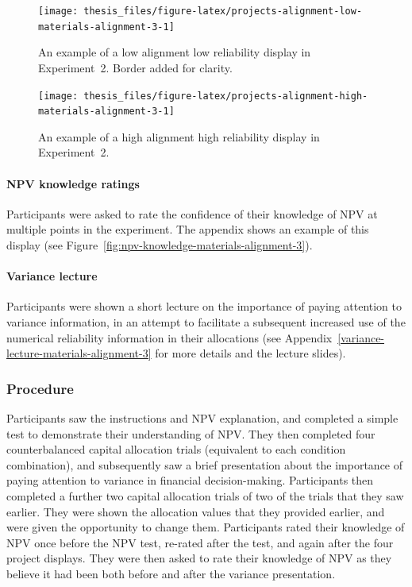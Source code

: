 \documentclass[a4paper, nobind, dvipsnames]{templates/ociamthesis}
\theoremstyle{definition}
\theoremstyle{definition}
\theoremstyle{definition}
\theoremstyle{definition}
\theoremstyle{remark}
\begin{document}
\begin{figure}
\texttt{[image: thesis\_files/figure-latex/projects-alignment-low-materials-alignment-3-1]} \caption{An example of a low alignment low reliability display in Experiment~2. Border added for clarity.}\label{fig:projects-alignment-low-materials-alignment-3}
\end{figure}



\begin{figure}
\texttt{[image: thesis\_files/figure-latex/projects-alignment-high-materials-alignment-3-1]} \caption{An example of a high alignment high reliability display in Experiment~2.}\label{fig:projects-alignment-high-materials-alignment-3}
\end{figure}

\paragraph{NPV knowledge ratings}

Participants were asked to rate the confidence of their knowledge of NPV at
multiple points in the experiment. The appendix shows an example of this display
(see Figure~\ref{fig:npv-knowledge-materials-alignment-3}).

\paragraph{Variance lecture}

Participants were shown a short lecture on the importance of paying attention to
variance information, in an attempt to facilitate a subsequent increased use of
the numerical reliability information in their allocations (see
Appendix~\ref{variance-lecture-materials-alignment-3} for more details and the
lecture slides).

\hypertarget{procedure-alignment-3}{%
\subsubsection{Procedure}\label{procedure-alignment-3}}

Participants saw the instructions and NPV explanation, and completed a simple
test to demonstrate their understanding of NPV. They then completed four
counterbalanced capital allocation trials (equivalent to each condition
combination), and subsequently saw a brief presentation about the importance of
paying attention to variance in financial decision-making. Participants then
completed a further two capital allocation trials of two of the trials that they
saw earlier. They were shown the allocation values that they provided earlier,
and were given the opportunity to change them. Participants rated their
knowledge of NPV once before the NPV test, re-rated after the test, and again
after the four project displays. They were then asked to rate their knowledge of
NPV as they believe it had been both before and after the variance presentation.
\end{document}
